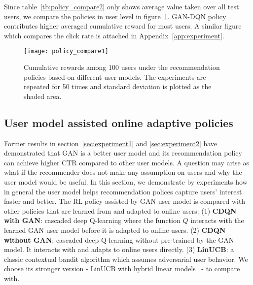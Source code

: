 \documentclass{article} %
\begin{document}
Since table~\ref{tb:policy_compare2} only shows average value taken over all test users, we compare the policies in user level in figure~\ref{fg:policy_compare_rwd}.
GAN-DQN policy contributes higher averaged cumulative reward for most users. A similar figure which compares the click rate is attached in Appendix~\ref{app:experiment}.

\begin{figure}[ht!]
\vspace{-1mm}
\centering
\texttt{[image: policy\_compare1]}
\vspace{-5mm}
\caption{\small Cumulative rewards among 100 users under the recommendation policies based on different user models. The experiments are repeated for 50 times and standard deviation is plotted as the shaded area.}
\label{fg:policy_compare_rwd}
\vspace{-3mm}
\end{figure}

\vspace{-3mm}
\subsection{User model assisted online adaptive policies}\label{sec:experiment3}
\vspace{-3mm}

Former results in section~\ref{sec:experiment1} and \ref{sec:experiment2} have demonstrated that GAN is a better user model and its recommendation policy can achieve higher CTR compared to other user models. A question may arise as what if the recommender does not make any assumption on users and why the user model would be useful. In this section, we demonstrate by experiments how in general the user model helps recommendation polices capture users' interest faster and better. The RL policy assisted by GAN user model is compared with other policies that are learned from and adapted to online users: (1) {\bf CDQN with GAN}: cascaded deep Q-learning where the function $Q$ interacts with the learned GAN user model before it is adapted to online users. (2) {\bf CDQN without GAN}: cascaded deep Q-learning without pre-trained by the GAN model. It interacts with and adapts to online users directly. (3) {\bf LinUCB}: a classic contextual bandit algorithm which assumes adversarial user behavior. We choose its stronger version - LinUCB with hybrid linear models~\citep{LiChuLanSch10} - to compare with.
\end{document}
